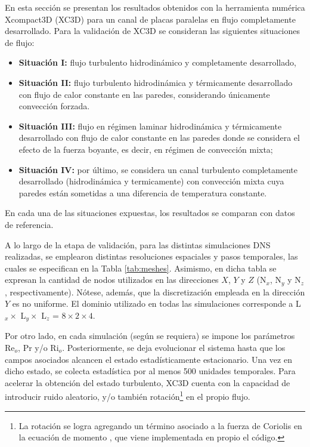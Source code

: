 En esta sección se presentan los resultados obtenidos con la herramienta numérica Xcompact3D (XC3D) para un canal de placas paralelas en flujo completamente desarrollado. Para la validación de XC3D se consideran las siguientes situaciones de flujo: 

\begin{itemize}

\item \textbf{Situación I:} flujo turbulento hidrodinámico y completamente desarrollado,

\item \textbf{Situación II:} flujo turbulento hidrodinámica y térmicamente desarrollado con flujo de calor constante en las paredes, considerando únicamente convección forzada.

\item \textbf{Situación III:} flujo en régimen laminar hidrodinámica y térmicamente desarrollado con flujo de calor constante en las paredes donde se considera el efecto de la fuerza boyante, es decir, en régimen de convección mixta; 

\item \textbf{Situación IV:} por último, se considera un canal turbulento completamente desarrollado (hidrodinámica y termicamente) con convección mixta cuya paredes están sometidas a una diferencia de temperatura constante. 

\end{itemize}
En cada una de las situaciones expuestas, los resultados se comparan con datos de referencia.

A lo largo de la etapa de validación, para las distintas simulaciones DNS realizadas, se emplearon distintas resoluciones espaciales y pasos temporales, las cuales se especifican en la Tabla \ref{tab:meshes}. Asimismo, en dicha tabla se expresan la cantidad de nodos utilizados en las direcciones $X$, $Y$ y $Z$ (N$_x$, N$_y$ y N$_z$, respectivamente). Nótese, además, que la discretización empleada en la dirección $Y$ es no uniforme. El dominio utilizado en todas las simulaciones corresponde a L$_x \times$ L$_y \times$ L$_z$ = $8 \times 2 \times 4$.

Por otro lado, en cada simulación (según se requiera) se impone los parámetros Re$_o$, Pr y/o Ri$_o$. Posteriormente, se deja evolucionar el sistema hasta que los campos asociados alcancen el estado estadísticamente estacionario. Una vez en dicho estado, se colecta estadística por al menos 500 unidades temporales. Para acelerar la obtención del estado turbulento, XC3D cuenta con la capacidad de introducir  ruido aleatorio, y/o también rotación\footnote{La rotación se logra agregando un término asociado a la fuerza de Coriolis en la ecuación de momento \cite{lamballais2014}, que viene implementada en propio el código.} en el propio flujo. 

